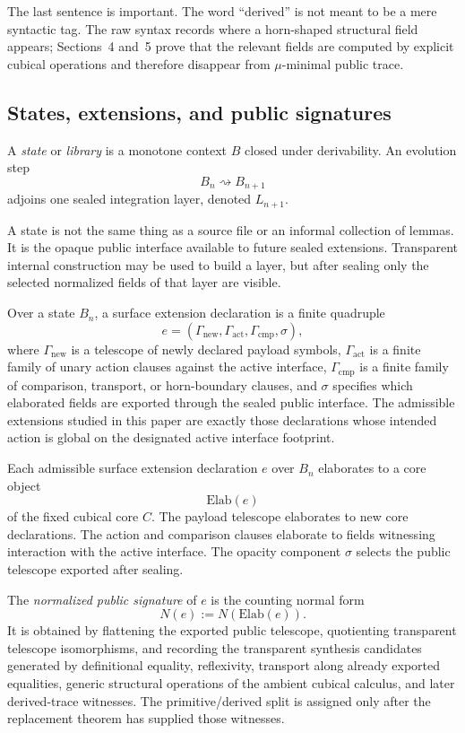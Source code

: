 \documentclass{lmcs}
\begin{document}
The last sentence is important.  The word ``derived'' is not meant to be a mere syntactic tag.
The raw syntax records where a horn-shaped structural field appears; Sections~4 and~5 prove
that the relevant fields are computed by explicit cubical operations and therefore disappear
from \(\mu\)-minimal public trace.

\subsection{States, extensions, and public signatures}

\begin{defi}[State]
A \emph{state} or \emph{library} is a monotone context \(B\) closed under derivability.  An
evolution step
\[
  B_n \rightsquigarrow B_{n+1}
\]
adjoins one sealed integration layer, denoted \(L_{n+1}\).
\end{defi}

A state is not the same thing as a source file or an informal collection of lemmas.  It is the
opaque public interface available to future sealed extensions.  Transparent internal
construction may be used to build a layer, but after sealing only the selected normalized
fields of that layer are visible.

\begin{defi}
Over a state \(B_n\), a surface extension declaration is a finite quadruple
\[
  e=(\Gamma_{\mathrm{new}},\Gamma_{\mathrm{act}},\Gamma_{\mathrm{cmp}},\sigma),
\]
where \(\Gamma_{\mathrm{new}}\) is a telescope of newly declared payload symbols,
\(\Gamma_{\mathrm{act}}\) is a finite family of unary action clauses against the active
interface, \(\Gamma_{\mathrm{cmp}}\) is a finite family of comparison, transport, or
horn-boundary clauses, and \(\sigma\) specifies which elaborated fields are exported through
the sealed public interface.  The admissible extensions studied in this paper are exactly
those declarations whose intended action is global on the designated active interface
footprint.
\end{defi}

\begin{defi}
Each admissible surface extension declaration \(e\) over \(B_n\) elaborates to a core object
\[
  \mathrm{Elab}(e)
\]
of the fixed cubical core \(C\).  The payload telescope elaborates to new core declarations.
The action and comparison clauses elaborate to fields witnessing interaction with the active
interface.  The opacity component \(\sigma\) selects the public telescope exported after
sealing.

The \emph{normalized public signature} of \(e\) is the counting normal form
\[
  N(e) := N(\mathrm{Elab}(e)).
\]
It is obtained by flattening the exported public telescope, quotienting transparent telescope
isomorphisms, and recording the transparent synthesis candidates generated by definitional
equality, reflexivity, transport along already exported equalities, generic structural
operations of the ambient cubical calculus, and later derived-trace witnesses.  The
primitive/derived split is assigned only after the replacement theorem has supplied those
witnesses.
\end{defi}
\end{document}
